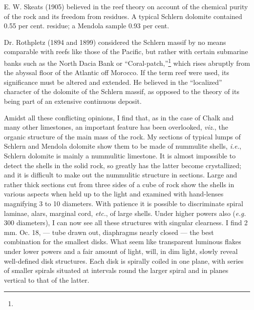 \documentclass[a4paper, 12pt, oneside]{article}
\begin{document}
E. W. Skeats (1905) believed in the reef theory on account of the chemical purity of the rock and its freedom from residues. A typical Schlern dolomite contained 0.55 per cent. residue; a Mendola sample 0.93 per cent.

Dr. Rothpletz (1894 and 1899) considered the Schlern massif by no means comparable with reefs like those of the Pacific, but rather with certain submarine banks such as the North Dacia Bank or ``Coral-patch,''\footnote{} which rises abruptly from the abyssal floor of the Atlantic off Morocco. If the term reef were used, its significance must be altered and extended. He believed in the ``localized'' character of the dolomite of the Schlern massif, as opposed to the theory of its being part of an extensive continuous deposit.

Amidst all these conflicting opinions, I find that, as in the case of Chalk and many other limestones, an important feature has been overlooked, \emph{viz.}, the organic structure of the main mass of the rock. My sections of typical lumps of Schlern and Mendola dolomite show them to be made of nummulite shells, \emph{i.e.}, Schlern dolomite is mainly a nummulitic limestone. It is almost impossible to detect the shells in the solid rock, so greatly has the latter become crystallized; and it is difficult to make out the nummulitic structure in sections. Large and rather thick sections cut from three sides of a cube of rock show the shells in various aspects when held up to the light and examined with hand-lenses magnifying 3 to 10 diameters. With patience it is possible to discriminate spiral laminae, alars, marginal cord, \emph{etc.}, of large shells. Under higher powers also (\emph{e.g.} 300 diameters), I can now see all these structures with singular clearness. I find 2 mm. Oc. 18, --- tube drawn out, diaphragms nearly closed --- the best combination for the smallest disks. What seem like transparent luminous flakes under lower powers and a fair amount of light, will, in dim light, slowly reveal well-defined disk structures. Each disk is spirally coiled in one plane, with series of smaller spirals situated at intervals round the larger spiral and in planes vertical to that of the latter.
\end{document}

